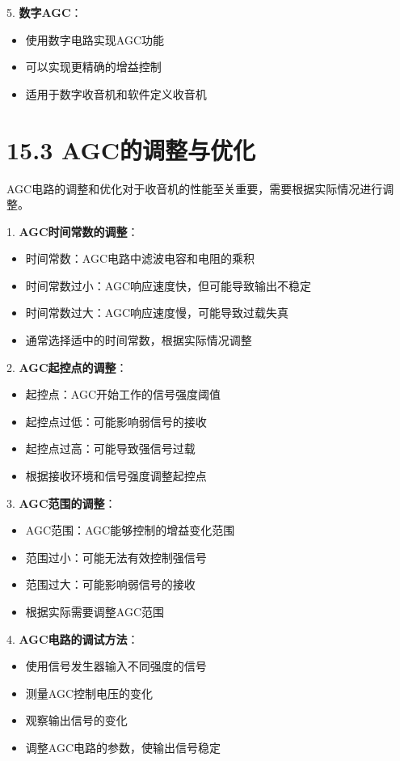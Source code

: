 \documentclass[12pt,UTF8]{ctexbook}
\begin{document}
5. \textbf{数字AGC}：
   \begin{itemize}[leftmargin=3.5em]
   \item 使用数字电路实现AGC功能
   \item 可以实现更精确的增益控制
   \item 适用于数字收音机和软件定义收音机
   \end{itemize}

\section*{15.3 AGC的调整与优化}

AGC电路的调整和优化对于收音机的性能至关重要，需要根据实际情况进行调整。

1. \textbf{AGC时间常数的调整}：
   \begin{itemize}[leftmargin=3.5em]
   \item 时间常数：AGC电路中滤波电容和电阻的乘积
   \item 时间常数过小：AGC响应速度快，但可能导致输出不稳定
   \item 时间常数过大：AGC响应速度慢，可能导致过载失真
   \item 通常选择适中的时间常数，根据实际情况调整
   \end{itemize}

2. \textbf{AGC起控点的调整}：
   \begin{itemize}[leftmargin=3.5em]
   \item 起控点：AGC开始工作的信号强度阈值
   \item 起控点过低：可能影响弱信号的接收
   \item 起控点过高：可能导致强信号过载
   \item 根据接收环境和信号强度调整起控点
   \end{itemize}

3. \textbf{AGC范围的调整}：
   \begin{itemize}[leftmargin=3.5em]
   \item AGC范围：AGC能够控制的增益变化范围
   \item 范围过小：可能无法有效控制强信号
   \item 范围过大：可能影响弱信号的接收
   \item 根据实际需要调整AGC范围
   \end{itemize}

4. \textbf{AGC电路的调试方法}：
   \begin{itemize}[leftmargin=3.5em]
   \item 使用信号发生器输入不同强度的信号
   \item 测量AGC控制电压的变化
   \item 观察输出信号的变化
   \item 调整AGC电路的参数，使输出信号稳定
   \end{itemize}
\end{document}
